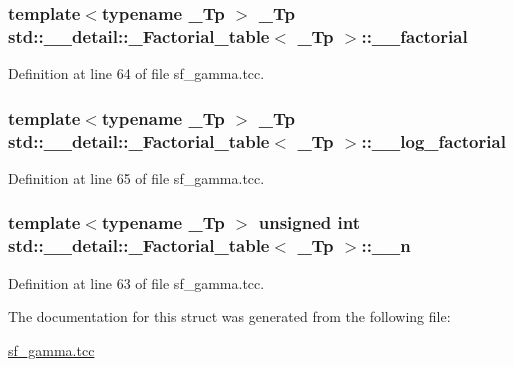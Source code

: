 \subsubsection[{\+\_\+\+\_\+factorial}]{\setlength{\rightskip}{0pt plus 5cm}template$<$typename \+\_\+\+Tp $>$ \+\_\+\+Tp {\bf std\+::\+\_\+\+\_\+detail\+::\+\_\+\+Factorial\+\_\+table}$<$ \+\_\+\+Tp $>$\+::\+\_\+\+\_\+factorial}\label{structstd_1_1____detail_1_1__Factorial__table_a4e8d20f3fa301037b097bb9f8e5f2060}


Definition at line 64 of file sf\+\_\+gamma.\+tcc.

\hypertarget{structstd_1_1____detail_1_1__Factorial__table_a9d4b412d4d8b46ec660b0441516f412c}{}
\subsubsection[{\+\_\+\+\_\+log\+\_\+factorial}]{\setlength{\rightskip}{0pt plus 5cm}template$<$typename \+\_\+\+Tp $>$ \+\_\+\+Tp {\bf std\+::\+\_\+\+\_\+detail\+::\+\_\+\+Factorial\+\_\+table}$<$ \+\_\+\+Tp $>$\+::\+\_\+\+\_\+log\+\_\+factorial}\label{structstd_1_1____detail_1_1__Factorial__table_a9d4b412d4d8b46ec660b0441516f412c}


Definition at line 65 of file sf\+\_\+gamma.\+tcc.

\hypertarget{structstd_1_1____detail_1_1__Factorial__table_ac05bdbe9d5090f0aa53adf8a3f8e3a45}{}
\subsubsection[{\+\_\+\+\_\+n}]{\setlength{\rightskip}{0pt plus 5cm}template$<$typename \+\_\+\+Tp $>$ unsigned int {\bf std\+::\+\_\+\+\_\+detail\+::\+\_\+\+Factorial\+\_\+table}$<$ \+\_\+\+Tp $>$\+::\+\_\+\+\_\+n}\label{structstd_1_1____detail_1_1__Factorial__table_ac05bdbe9d5090f0aa53adf8a3f8e3a45}


Definition at line 63 of file sf\+\_\+gamma.\+tcc.



The documentation for this struct was generated from the following file\+:\begin{DoxyCompactItemize}
\item 
\hyperlink{sf__gamma_8tcc}{sf\+\_\+gamma.\+tcc}\end{DoxyCompactItemize}
